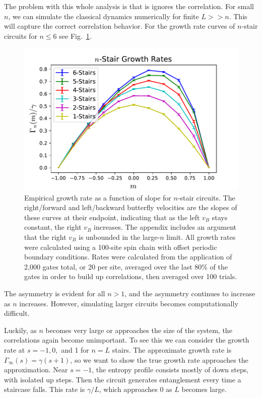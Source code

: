 \documentclass[aps,prx,reprint,superscriptaddress, longbibliography]{revtex4-1}
\begin{document}
The problem with this whole analysis is that is ignores the correlation. 
For small $n$, we can simulate the classical dynamics numerically for finite $L>>n$. This will capture the correct correlation behavior. For the growth rate curves of $n$-stair circuits for $n\le 6$ see Fig.~\ref{fig:compareRates}. 
\begin{figure}
	\includegraphics[width=\columnwidth]{compareRates.pdf}
	\caption{Empirical growth rate as a function of slope for $n$-stair circuits. The right/forward and left/backward butterfly velocities are the slopes of these curves at their endpoint, indicating that as the left $v_B$ stays constant, the right $v_B$ increases. The appendix includes an argument that the right $v_B$ is unbounded in the large-$n$ limit. All growth rates were calculated using a 100-site spin chain with offset periodic boundary conditions. Rates were calculated from the application of 2,000 gates total, or 20 per site, averaged over the last 80\% of the gates in order to build up correlations, then averaged over 100 trials.}
	\label{fig:compareRates}
\end{figure}
The asymmetry is evident for all $n>1$, and the asymmetry continues to increase as $n$ increases. However, simulating larger circuits becomes computationally difficult.

Luckily, as $n$ becomes very large or approaches the size of the system, the correlations again become unimportant. To see this we can consider the growth rate at $s = -1, 0,$ and 1 for $n=L$ stairs. The approximate growth rate is $\Gamma_\infty(s)=\gamma(s+1)$, so we want to show the true growth rate approaches the approximation. Near $s=-1$, the entropy profile consists mostly of down steps, with isolated up steps. Then the circuit generates entanglement every time a staircase falls. This rate is $\gamma/L$, which approaches 0 as $L$ becomes large.
\end{document}
